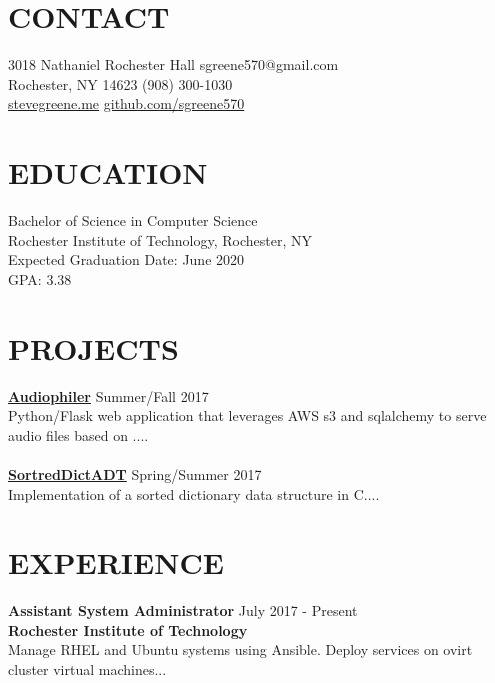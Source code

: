 \documentclass[line, margin]{res}
\begin{document}

\begin{resume}

\section {CONTACT}
3018 Nathaniel Rochester Hall \hfill sgreene570@gmail.com \\
Rochester, NY 14623 \hfill (908) 300-1030 \\
\url{stevegreene.me} \hfill \url{github.com/sgreene570}

\section{EDUCATION}
Bachelor of Science in Computer Science \\
Rochester Institute of Technology, Rochester, NY \\
Expected Graduation Date: June 2020 \\
GPA: 3.38

\section{PROJECTS}
{\bf \href{github.com/sgreene570/audiophiler}{Audiophiler}} \hfill Summer/Fall 2017 \\
Python/Flask web application that leverages AWS s3 and sqlalchemy to serve audio
files based on ....
\\
\\
{\bf \href{https://github.com/sgreene570/SortedDictADT}{SortredDictADT}} \hfill Spring/Summer 2017 \\
Implementation of a sorted dictionary data structure in C....\\

\section{EXPERIENCE}
{\bf \large{Assistant System Administrator}} \hfill July 2017 - Present \\
{\bf Rochester Institute of Technology} \\
Manage RHEL and Ubuntu systems using Ansible.  Deploy services on ovirt cluster virtual machines... \\


\end{resume}
\end{document}
